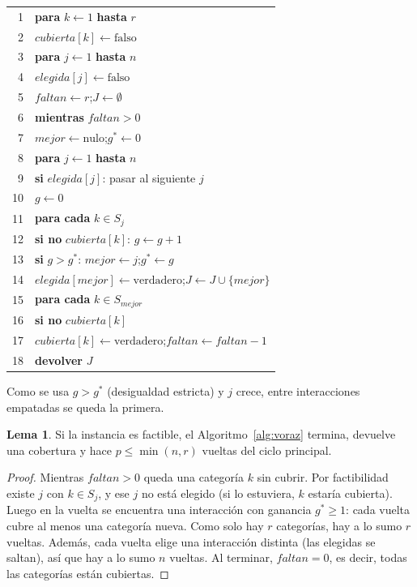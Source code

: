 \documentclass[11pt,a4paper]{article}
\theoremstyle{definition}
\newtheorem{lema}[definicion]{Lema}
\begin{document}
\begin{algorithm}[ht]
\caption{Voraz para la cobertura mínima de auditoría. Entrada: $r$ y $S_1,\dots,S_n$ (instancia factible). Salida: $J\subseteq[n]$ con $\bigcup_{j\in J}S_j=U$.}
\label{alg:voraz}
\small
\begin{tabular}{@{}r@{\hspace{1em}}l@{}}
1 & \textbf{para} $k\gets 1$ \textbf{hasta} $r$ \\
2 & \quad $cubierta[k]\gets\text{falso}$ \\
3 & \textbf{para} $j\gets 1$ \textbf{hasta} $n$ \\
4 & \quad $elegida[j]\gets\text{falso}$ \\
5 & $faltan\gets r$;\quad $J\gets\emptyset$ \\
6 & \textbf{mientras} $faltan>0$ \\
7 & \quad $mejor\gets\text{nulo}$;\quad $g^*\gets 0$ \\
8 & \quad \textbf{para} $j\gets 1$ \textbf{hasta} $n$ \\
9 & \quad\quad \textbf{si} $elegida[j]$: pasar al siguiente $j$ \\
10 & \quad\quad $g\gets 0$ \\
11 & \quad\quad \textbf{para cada} $k\in S_j$ \\
12 & \quad\quad\quad \textbf{si no} $cubierta[k]$: $g\gets g+1$ \\
13 & \quad\quad \textbf{si} $g>g^*$: $mejor\gets j$;\quad $g^*\gets g$ \\
14 & \quad $elegida[mejor]\gets\text{verdadero}$;\quad $J\gets J\cup\{mejor\}$ \\
15 & \quad \textbf{para cada} $k\in S_{mejor}$ \\
16 & \quad\quad \textbf{si no} $cubierta[k]$ \\
17 & \quad\quad\quad $cubierta[k]\gets\text{verdadero}$;\quad $faltan\gets faltan-1$ \\
18 & \textbf{devolver} $J$ \\
\end{tabular}
\end{algorithm}

Como se usa $g>g^*$ (desigualdad estricta) y $j$ crece, entre interacciones empatadas se queda la primera.

\begin{lema}\label{lema:voraz}
Si la instancia es factible, el Algoritmo~\ref{alg:voraz} termina, devuelve una cobertura y hace $p\le\min(n,r)$ vueltas del ciclo principal.
\end{lema}
\begin{proof}
Mientras $\mathit{faltan}>0$ queda una categoría $k$ sin cubrir. Por factibilidad existe $j$ con $k\in S_j$, y ese $j$ no está elegido (si lo estuviera, $k$ estaría cubierta). Luego en la vuelta se encuentra una interacción con ganancia $g^*\ge 1$: cada vuelta cubre al menos una categoría nueva. Como solo hay $r$ categorías, hay a lo sumo $r$ vueltas. Además, cada vuelta elige una interacción distinta (las elegidas se saltan), así que hay a lo sumo $n$ vueltas. Al terminar, $\mathit{faltan}=0$, es decir, todas las categorías están cubiertas.
\end{proof}
\end{document}

